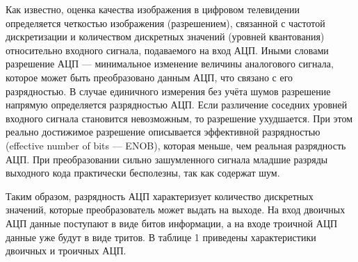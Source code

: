 \documentclass[10pt]{beamer}
\begin{document}
\begin{frame}[shrink=20,fragile]
\transdissolve[duration=0.2]
\begin{block}{}
	Как известно, оценка качества изображения в цифровом телевидении определяется четкостью изображения (разрешением), связанной с частотой дискретизации и количеством дискретных значений (уровней квантования) относительно входного сигнала, подаваемого на вход АЦП. Иными словами разрешение АЦП — минимальное изменение величины аналогового сигнала, которое может быть преобразовано данным АЦП, что связано с его разрядностью. В случае единичного измерения без учёта шумов разрешение напрямую определяется разрядностью АЦП. Если различение соседних уровней входного сигнала становится невозможным, то разрешение ухудшается. При этом реально достижимое разрешение описывается эффективной разрядностью (effective number of bits — ENOB), которая меньше, чем реальная разрядность АЦП. При преобразовании сильно зашумленного сигнала младшие разряды выходного кода практически бесполезны, так как содержат шум.
	
	Таким образом, разрядность АЦП характеризует количество дискретных значений, которые преобразователь может выдать на выходе. На вход двоичных АЦП данные поступают в виде битов информации, а на входе троичной АЦП данные уже будут в виде тритов. В таблице 1 приведены характеристики двоичных и троичных АЦП.
\end{block}   

\end{frame}
\end{document}
